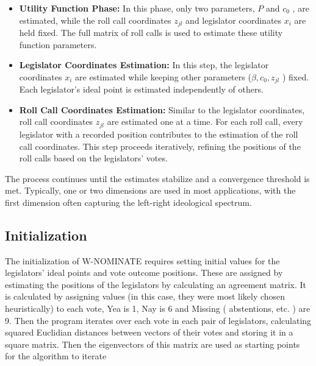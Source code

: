 \documentclass[a4paper,12pt]{report}
\begin{document}
                \begin{itemize}
                    \item \textbf{Utility Function Phase:} In this phase, only two parameters, \( P \) and \( c_0 \)
                    , are estimated,
                    while the roll call coordinates \( z_{jl} \) and legislator coordinates \( x_i \)
                    are held fixed. The full matrix of roll calls is used to estimate these utility function parameters.

                    \item \textbf{Legislator Coordinates Estimation:} In this step, the legislator coordinates \( x_i \)
                    are
                    estimated while keeping other parameters (\( \beta, c_0, z_{jl} \)
                    ) fixed. Each legislator's ideal point is estimated independently of others.

                    \item \textbf{Roll Call Coordinates Estimation:}
                    Similar to the legislator coordinates, roll call coordinates
                    \( z_{jl} \)
                    are estimated one at a time. For each roll call, every legislator with a recorded position
                    contributes to the
                    estimation of the roll call coordinates. This step proceeds iteratively, refining the positions of
                    the roll
                    calls based on the legislators' votes.
                \end{itemize}



                The process continues until the estimates stabilize and a
                convergence threshold is met. Typically, one or two dimensions are used in most applications, with the
                first dimension often capturing the left-right ideological spectrum.

            \subsection{Initialization}
                The initialization of W-NOMINATE requires setting initial values for the legislators' ideal points and
                vote outcome positions. These are assigned by estimating the positions of
                the legislators by calculating an agreement matrix. It is calculated by assigning values (in this
                case, they were most likely chosen heuristically) to each vote, Yea is 1, Nay is 6 and Missing (
                abstentions, etc. ) are 9. Then the program iterates over each vote in each pair of legislators,
                calculating squared Euclidian distances between vectors of their votes and storing it in a square
                matrix. Then the
                eigenvectors of this matrix are used as starting points for the algorithm to iterate
\end{document}
